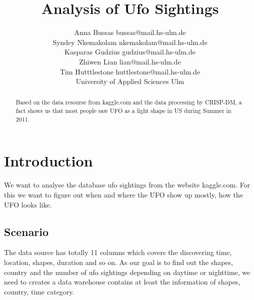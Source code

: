 \documentclass[11pt, journal]{IEEEtran}
\begin{document}
%
\title{Analysis of Ufo Sightings}


\author{ \parbox{3 in}{\centering Anna Bussas bussas@mail.hs-ulm.de\\
Syndey Nkemakolam nkemakolam@mail.hs-ulm.de\\
Kasparas Gudzius gudzius@mail.hs-ulm.de\\
Zhiwen Lian lian@mail.hs-ulm.de\\
Tim Hutttlestone huttlestone@mail.hs-ulm.de\\
				 University of Applied Sciences Ulm\\
 }
}






\maketitle

\begin{abstract}
Based on the data resourse from kaggle.com and the data processing by CRISP-DM, a fact shows us that most people saw UFO as a light shape in US during Summer in 2011. 
\end{abstract}


\section{Introduction}
\label{sec:intro}
We want to analyse the database ufo sightings from
the website kaggle.com. For this we want to figure out 
when and where the UFO show up mostly, how the UFO looks like. 
\subsection{Scenario} \label{subsec:scenario}
The data source has totally 11 columns which covers the discovering time, location, shapes, duration and so on. As our goal is to find out the shapes, country and the number of ufo sightings depending on daytime or nighttime, we need to creates a data warehouse contains at least the information of shapes, country, time category.
\end{document}
